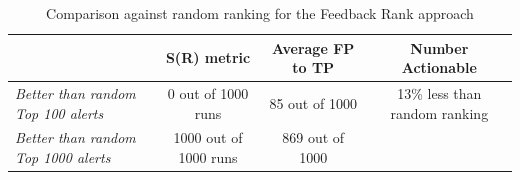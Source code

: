 \begin{table}[H]
	\caption{Comparison against random ranking for the Feedback Rank approach}
	\label{results:ranking_fbrank}
	\centering
	\begin{tabular}{@{}lccc@{}}
		\toprule
		& \textbf{S(R) metric}  & \textbf{Average FP to TP} & \textbf{Number Actionable}    \\ \midrule
		\textit{Better than random Top 100 alerts}  & 0 out of 1000 runs    & 85 out of 1000            & 13\% less than random ranking \\
		\textit{Better than random Top 1000 alerts} & 1000 out of 1000 runs & 869 out of 1000           &                               \\ \bottomrule
	\end{tabular}
\end{table}

